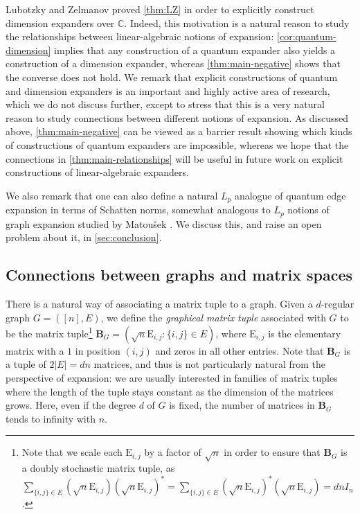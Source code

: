 \documentclass{toc}
\theoremstyle{plain}
\numberwithin{equation}{section}
\theoremstyle{definition}
\newcommand{\bC}{\mathbb{C}}
\newcommand{\ab}[1]{\left\lvert#1\right\rvert}
\newcommand{\tuple}[1]{\mathbf{#1}}
\newcommand{\vB}{\tuple{B}}
\newcommand{\E}{\mathrm{E}}
\begin{document}
Lubotzky and Zelmanov \cite{LUBOTZKY2008730} proved \cref{thm:LZ} in order to explicitly construct dimension expanders over $\bC$. Indeed, this motivation is a natural reason to study the relationships between linear-algebraic notions of expansion: \cref{cor:quantum-dimension} implies that any construction of a quantum expander also yields a construction of a dimension expander, whereas \cref{thm:main-negative} shows that the converse does not hold.
We remark that explicit constructions of quantum and dimension expanders is an important and highly active area of research, which we do not discuss further, except to stress that this is a very natural reason to study connections between different notions of expansion. As discussed above, \cref{thm:main-negative} can be viewed as a barrier result showing which kinds of constructions of quantum expanders are impossible, whereas we hope that the connections in \cref{thm:main-relationships} will be useful in future work on explicit constructions of linear-algebraic expanders.

We also remark that one can also define a natural $L_p$ analogue of quantum edge expansion in terms of Schatten norms, somewhat analogous to $L_p$ notions of graph expansion studied by Matou\v sek \cite{Matousek97}. We discuss this, and raise an open problem about it, in \cref{sec:conclusion}.

\subsection{Connections between graphs and matrix spaces}
There is a natural way of associating a matrix tuple to a graph. 
%
%
%
%
%
%
%
Given a $d$-regular graph $G=([n],E)$, we define the \emph{graphical matrix tuple}
associated with $G$  %
to be the matrix tuple\footnote{Note that we scale each $\E_{i,j}$ by a factor of $\sqrt n$ in order to ensure that $\vB_G$ is a doubly stochastic matrix tuple, as $\sum_{\{i,j\}\in E} (\sqrt n \E_{i,j})(\sqrt n \E_{i,j})^*=\sum_{\{i,j\}\in E} (\sqrt n \E_{i,j})^*(\sqrt n \E_{i,j})=dnI_n$.} $\vB_G = (\sqrt n\E_{i,j}:\{i,j\} \in E)$, where $\E_{i,j}$ is the elementary matrix with a $1$ in position $(i,j)$ and zeros in all other entries. Note that $\vB_G$ is a tuple of $2\ab E=dn$ matrices, and thus is not particularly natural from the perspective of expansion: we are usually interested in families of matrix tuples where the length of the tuple stays constant as the dimension of the matrices grows. Here, even if the degree $d$ of $G$ is fixed, the number of matrices in $\vB_G$ tends to infinity with $n$.
\end{document}
